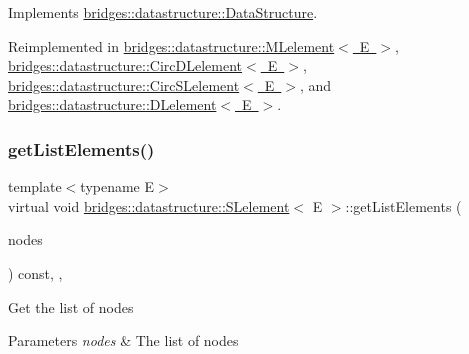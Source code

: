 Implements \mbox{\hyperlink{classbridges_1_1datastructure_1_1_data_structure_a4ff66cb34409f11fe9fc647f6d8a22ce}{bridges\+::datastructure\+::\+Data\+Structure}}.



Reimplemented in \mbox{\hyperlink{classbridges_1_1datastructure_1_1_m_lelement_a735c3cb43648b4d4e7d3316cdc1a1952}{bridges\+::datastructure\+::\+M\+Lelement$<$ E $>$}}, \mbox{\hyperlink{classbridges_1_1datastructure_1_1_circ_d_lelement_aec7f9b9dc6626c1a872feb91cd65425d}{bridges\+::datastructure\+::\+Circ\+D\+Lelement$<$ E $>$}}, \mbox{\hyperlink{classbridges_1_1datastructure_1_1_circ_s_lelement_a775ba08a7811fe91c396cb27ba9343ab}{bridges\+::datastructure\+::\+Circ\+S\+Lelement$<$ E $>$}}, and \mbox{\hyperlink{classbridges_1_1datastructure_1_1_d_lelement_a736ba8e6901608fb0ab04d781d2cceee}{bridges\+::datastructure\+::\+D\+Lelement$<$ E $>$}}.

\mbox{\label{classbridges_1_1datastructure_1_1_s_lelement_ae23666410cc02ec8035d75c99c121c06}} 
\subsubsection{\texorpdfstring{getListElements()}{getListElements()}}
{\footnotesize\ttfamily template$<$typename E$>$ \\
virtual void \mbox{\hyperlink{classbridges_1_1datastructure_1_1_s_lelement}{bridges\+::datastructure\+::\+S\+Lelement}}$<$ E $>$\+::get\+List\+Elements (\begin{DoxyParamCaption}\item[{vector$<$ const \mbox{\hyperlink{classbridges_1_1datastructure_1_1_s_lelement}{S\+Lelement}}$<$ E $>$ $\ast$ $>$ \&}]{nodes }\end{DoxyParamCaption}) const\hspace{0.3cm}{\ttfamily [inline]}, {\ttfamily [protected]}, {\ttfamily [virtual]}}

Get the list of nodes


\begin{DoxyParams}{Parameters}
{\em nodes} & The list of nodes \\
\hline
\end{DoxyParams}
\mbox{\label{classbridges_1_1datastructure_1_1_s_lelement_ae43dd771d9ced7cb17f1d35f34cd9a42}} 
